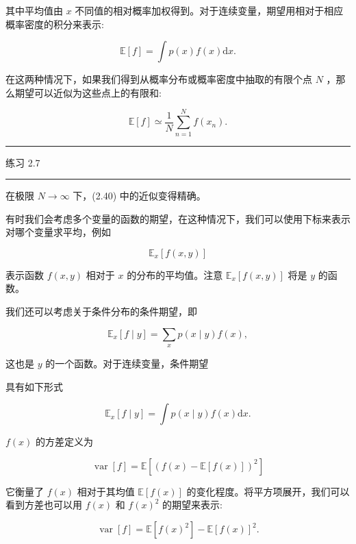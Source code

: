 \documentclass[10pt]{report}
\newcommand{\HRule}{\begin{center}\rule{0.9\linewidth}{0.2mm}\end{center}}
\begin{document}
其中平均值由 \(x\) 不同值的相对概率加权得到。对于连续变量，期望用相对于相应概率密度的积分来表示:

\[
\mathbb{E}\left\lbrack  f\right\rbrack   = \int p\left( x\right) f\left( x\right) \mathrm{d}x. \tag{2.39}
\]

在这两种情况下，如果我们得到从概率分布或概率密度中抽取的有限个点 \(N\) ，那么期望可以近似为这些点上的有限和:

\[
\mathbb{E}\left\lbrack  f\right\rbrack   \simeq  \frac{1}{N}\mathop{\sum }\limits_{{n = 1}}^{N}f\left( {x}_{n}\right) . \tag{2.40}
\]

\HRule

练习 2.7

\HRule

在极限 \(N \rightarrow  \infty\) 下，(2.40) 中的近似变得精确。

有时我们会考虑多个变量的函数的期望，在这种情况下，我们可以使用下标来表示对哪个变量求平均，例如

\[
{\mathbb{E}}_{x}\left\lbrack  {f\left( {x,y}\right) }\right\rbrack   \tag{2.41}
\]

表示函数 \(f\left( {x,y}\right)\) 相对于 \(x\) 的分布的平均值。注意 \({\mathbb{E}}_{x}\left\lbrack  {f\left( {x,y}\right) }\right\rbrack\) 将是 \(y\) 的函数。

我们还可以考虑关于条件分布的条件期望，即

\[
{\mathbb{E}}_{x}\left\lbrack  {f \mid  y}\right\rbrack   = \mathop{\sum }\limits_{x}p\left( {x \mid  y}\right) f\left( x\right) , \tag{2.42}
\]

这也是 \(y\) 的一个函数。对于连续变量，条件期望

具有如下形式

\[
{\mathbb{E}}_{x}\left\lbrack  {f \mid  y}\right\rbrack   = \int p\left( {x \mid  y}\right) f\left( x\right) \mathrm{d}x. \tag{2.43}
\]

\(f\left( x\right)\) 的方差定义为

\[
\operatorname{var}\left\lbrack  f\right\rbrack   = \mathbb{E}\left\lbrack  {\left( f\left( x\right)  - \mathbb{E}\left\lbrack  f\left( x\right) \right\rbrack  \right) }^{2}\right\rbrack   \tag{2.44}
\]

它衡量了 \(f\left( x\right)\) 相对于其均值 \(\mathbb{E}\left\lbrack  {f\left( x\right) }\right\rbrack\) 的变化程度。将平方项展开，我们可以看到方差也可以用 \(f\left( x\right)\) 和 \(f{\left( x\right) }^{2}\) 的期望来表示:

\[
\operatorname{var}\left\lbrack  f\right\rbrack   = \mathbb{E}\left\lbrack  {f{\left( x\right) }^{2}}\right\rbrack   - \mathbb{E}{\left\lbrack  f\left( x\right) \right\rbrack  }^{2}. \tag{2.45}
\]
\end{document}
